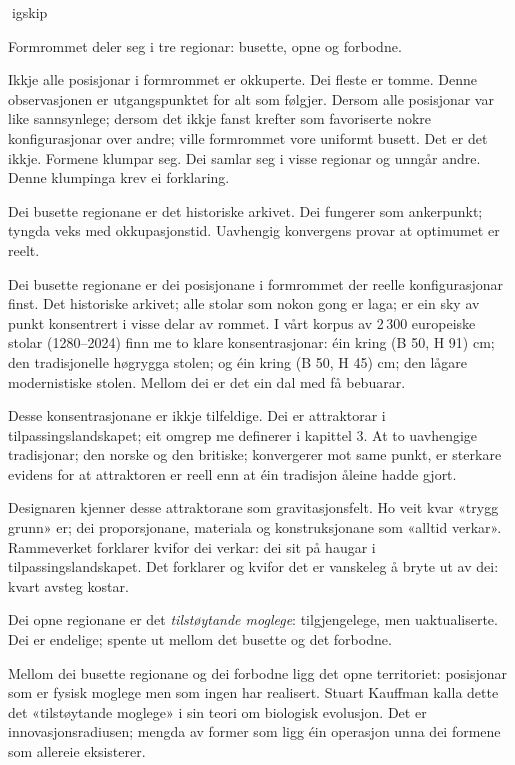 igskip

Formrommet deler seg i tre regionar: busette, opne og forbodne.

Ikkje alle posisjonar i formrommet er okkuperte. Dei fleste er tomme. Denne observasjonen er utgangspunktet for alt som følgjer. Dersom alle posisjonar var like sannsynlege; dersom det ikkje fanst krefter som favoriserte nokre konfigurasjonar over andre; ville formrommet vore uniformt busett. Det er det ikkje. Formene klumpar seg. Dei samlar seg i visse regionar og unngår andre. Denne klumpinga krev ei forklaring.

Dei busette regionane er det historiske arkivet. Dei fungerer som ankerpunkt; tyngda veks med okkupasjonstid. Uavhengig konvergens provar at optimumet er reelt.

Dei busette regionane er dei posisjonane i formrommet der reelle konfigurasjonar finst. Det historiske arkivet; alle stolar som nokon gong er laga; er ein sky av punkt konsentrert i visse delar av rommet. I vårt korpus av 2\,300 europeiske stolar (1280--2024) finn me to klare konsentrasjonar: éin kring (B  50, H  91) cm; den tradisjonelle høgrygga stolen; og éin kring (B  50, H  45) cm; den lågare modernistiske stolen. Mellom dei er det ein dal med få bebuarar.

Desse konsentrasjonane er ikkje tilfeldige. Dei er attraktorar i tilpassingslandskapet; eit omgrep me definerer i kapittel 3. At to uavhengige tradisjonar; den norske og den britiske; konvergerer mot same punkt, er sterkare evidens for at attraktoren er reell enn at éin tradisjon åleine hadde gjort.

Designaren kjenner desse attraktorane som gravitasjonsfelt. Ho veit kvar «trygg grunn» er; dei proporsjonane, materiala og konstruksjonane som «alltid verkar». Rammeverket forklarer kvifor dei verkar: dei sit på haugar i tilpassingslandskapet. Det forklarer og kvifor det er vanskeleg å bryte ut av dei: kvart avsteg kostar.

Dei opne regionane er det \textit{tilstøytande moglege}: tilgjengelege, men uaktualiserte. Dei er endelige; spente ut mellom det busette og det forbodne.

Mellom dei busette regionane og dei forbodne ligg det opne territoriet: posisjonar som er fysisk moglege men som ingen har realisert. Stuart Kauffman kalla dette det «tilstøytande moglege» i sin teori om biologisk evolusjon. Det er innovasjonsradiusen; mengda av former som ligg éin operasjon unna dei formene som allereie eksisterer.

